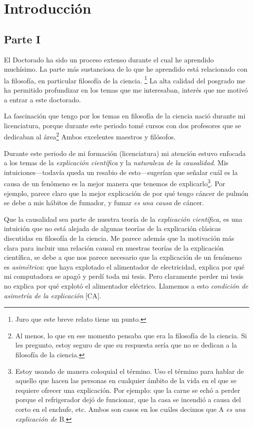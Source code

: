 
\chapter{Introducción}\label{ch:introduction}

\section*{Parte I}


\noindent El Doctorado ha sido un proceso extenso
durante el cual he aprendido muchísimo. La parte más
sustanciosa de lo que he aprendido está relacionado
con la filosofía, en particular filosofía de la ciencia.
\footnote{
	Juro que este breve relato tiene un punto.
}
La alta calidad del posgrado me ha permitido
profundizar en los temas que me interesaban, interés
que me motivó a entrar a este doctorado.

La fascinación que tengo por los temas en filosofía de
la ciencia nació durante mi licenciatura, porque
durante este periodo tomé cursos con dos profesores
que se dedicaban al área\footnote{
	Al menos, lo que en ese momento pensaba que era la
	filosofía de la	ciencia. Si les pregunto, estoy
	seguro de que su respuesta sería que no se dedican
	a la filosofía de la ciencia.
}
Ambos excelentes maestros y filósofos.

Durante este periodo de mi formación (licenciatura) mi
atención estuvo enfocada a los temas de la \emph{explicación
científica} y la \emph{naturaleza de la causalidad}. Mis
intuiciones---todavía queda un resabio de esto---sugerían
que señalar cuál es la causa de un fenómeno es la mejor
manera que tenemos de
explicarlo\footnote{
	Estoy usando de manera coloquial el término. Uso el
	término para hablar de aquello que hacen las
	personas en cualquier ámbito de la vida en el que se
	requiere ofrecer una explicación. Por ejemplo: que la
	carne se echó a perder porque el refrigerador
	dejó de funcionar, que la casa se incendió a causa
	del corto en el enchufe, etc. Ambos son casos en los
	cuáles decimos que A \emph{es una explicación de} B.
}.
Por ejemplo, parece claro que la mejor explicación de
por qué tengo cáncer de pulmón se debe a mis hábitos
de fumador, y fumar \emph{es una causa} de cáncer.

Que la causalidad sea parte de nuestra teoría de la
\emph{explicación científica,} es una intuición que no
está alejada de algunas teorías de la explicación
clásicas discutidas en filosofía de la ciencia. Me
parece además que la motivación más clara para incluir
una relación causal en nuestras teorías de la
explicación científica, se debe a que nos parece
necesario que la explicación de un fenómeno es \emph{
asimétrica}: que haya explotado el alimentador de
electricidad, explica por qué mi computadora se apagó
y perdí toda mi tesis. Pero claramente perder mi tesis
no explica por qué explotó el alimentador eléctrico.
Llamemos a esto \emph{condición de asimetría de la
explicación} [CA].

